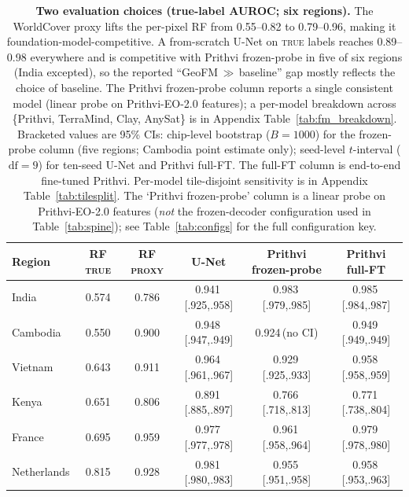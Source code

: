 \documentclass{article}
\newcommand{\tablebodygap}{\vspace{0.45em}}
\begin{document}
\begin{table}[H]
\centering\small
\caption{\textbf{Two evaluation choices (true-label AUROC; six regions).} The
WorldCover proxy lifts the per-pixel RF from 0.55--0.82 to 0.79--0.96, making it
foundation-model-competitive. A from-scratch U-Net on \textsc{true} labels reaches
0.89--0.98 everywhere and is competitive with Prithvi frozen-probe in five of six
regions (India excepted), so the reported ``GeoFM\,$\gg$\,baseline'' gap mostly
reflects the choice of baseline. The Prithvi frozen-probe column reports a single
consistent model (linear probe on Prithvi-EO-2.0 features); a per-model breakdown
across \{Prithvi, TerraMind, Clay, AnySat\} is in Appendix Table~\ref{tab:fm_breakdown}.
Bracketed values are 95\% CIs: chip-level bootstrap ($B{=}1000$) for the
frozen-probe column (five regions; Cambodia point estimate only); seed-level
$t$-interval ($\mathrm{df}=9$) for ten-seed U-Net and Prithvi full-FT. The full-FT
column is end-to-end fine-tuned Prithvi. Per-model tile-disjoint sensitivity is in
Appendix Table~\ref{tab:tilesplit}. The `Prithvi frozen-probe' column is a
linear probe on Prithvi-EO-2.0 features (\emph{not} the frozen-decoder
configuration used in Table~\ref{tab:spine}); see Table~\ref{tab:configs} for
the full configuration key.}
\label{tab:flaws}
\tablebodygap
\begin{tabular}{lccccc}
\toprule
Region & RF \textsc{true} & RF \textsc{proxy} & U-Net & Prithvi frozen-probe & Prithvi full-FT \\
\midrule
India        & 0.574 & 0.786 & 0.941\,{\scriptsize[.925,.958]} & 0.983\,{\scriptsize[.979,.985]} & 0.985\,{\scriptsize[.984,.987]} \\
Cambodia     & 0.550 & 0.900 & 0.948\,{\scriptsize[.947,.949]} & 0.924\,{\scriptsize(no CI)}            & 0.949\,{\scriptsize[.949,.949]} \\
Vietnam      & 0.643 & 0.911 & 0.964\,{\scriptsize[.961,.967]} & 0.929\,{\scriptsize[.925,.933]} & 0.958\,{\scriptsize[.958,.959]} \\
Kenya        & 0.651 & 0.806 & 0.891\,{\scriptsize[.885,.897]} & 0.766\,{\scriptsize[.718,.813]} & 0.771\,{\scriptsize[.738,.804]} \\
France       & 0.695 & 0.959 & 0.977\,{\scriptsize[.977,.978]} & 0.961\,{\scriptsize[.958,.964]} & 0.979\,{\scriptsize[.978,.980]} \\
Netherlands  & 0.815 & 0.928 & 0.981\,{\scriptsize[.980,.983]} & 0.955\,{\scriptsize[.951,.958]} & 0.958\,{\scriptsize[.953,.963]} \\
\bottomrule
\end{tabular}
\end{table}
\FloatBarrier
\end{document}
